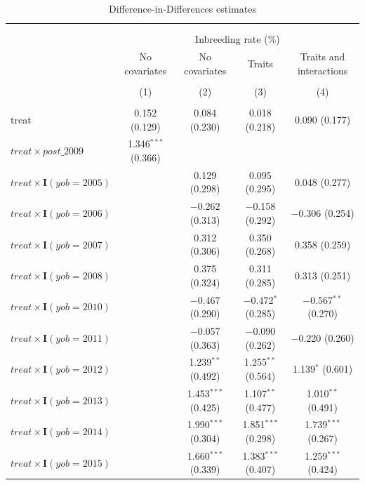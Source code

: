 
\begin{table}[H] \centering 
  \caption{Difference-in-Differences estimates} 
  \label{tab:table1} 
\small 
\begin{tabular}{@{\extracolsep{5pt}}lcccc} 
\\[-1.8ex]\hline 
\hline \\[-1.8ex] 
\\[-1.8ex] & \multicolumn{4}{c}{Inbreeding rate (\%)} \\ 
 & No covariates & No covariates & Traits & Traits and interactions \\ 
\\[-1.8ex] & (1) & (2) & (3) & (4)\\ 
\hline \\[-1.8ex] 
 treat & 0.152 (0.129) & 0.084 (0.230) & 0.018 (0.218) & 0.090 (0.177) \\ 
  $treat \times post\_2009$ & 1.346$^{***}$ (0.366) &  &  &  \\ 
  $treat \times\mathbf{I}(yob =2005)$ &  & 0.129 (0.298) & 0.095 (0.295) & 0.048 (0.277) \\ 
  $treat \times\mathbf{I}(yob =2006)$ &  & $-$0.262 (0.313) & $-$0.158 (0.292) & $-$0.306 (0.254) \\ 
  $treat \times\mathbf{I}(yob =2007)$ &  & 0.312 (0.306) & 0.350 (0.268) & 0.358 (0.259) \\ 
  $treat \times\mathbf{I}(yob =2008)$ &  & 0.375 (0.324) & 0.311 (0.285) & 0.313 (0.251) \\ 
  $treat \times\mathbf{I}(yob =2010)$ &  & $-$0.467 (0.290) & $-$0.472$^{*}$ (0.285) & $-$0.567$^{**}$ (0.270) \\ 
  $treat \times\mathbf{I}(yob =2011)$ &  & $-$0.057 (0.363) & $-$0.090 (0.262) & $-$0.220 (0.260) \\ 
  $treat \times\mathbf{I}(yob =2012)$ &  & 1.239$^{**}$ (0.492) & 1.255$^{**}$ (0.564) & 1.139$^{*}$ (0.601) \\ 
  $treat \times\mathbf{I}(yob =2013)$ &  & 1.453$^{***}$ (0.425) & 1.107$^{**}$ (0.477) & 1.010$^{**}$ (0.491) \\ 
  $treat \times\mathbf{I}(yob =2014)$ &  & 1.990$^{***}$ (0.304) & 1.851$^{***}$ (0.298) & 1.739$^{***}$ (0.267) \\ 
  $treat \times\mathbf{I}(yob =2015)$ &  & 1.660$^{***}$ (0.339) & 1.383$^{***}$ (0.407) & 1.259$^{***}$ (0.424) \\ 

\end{tabular}
\end{table}
